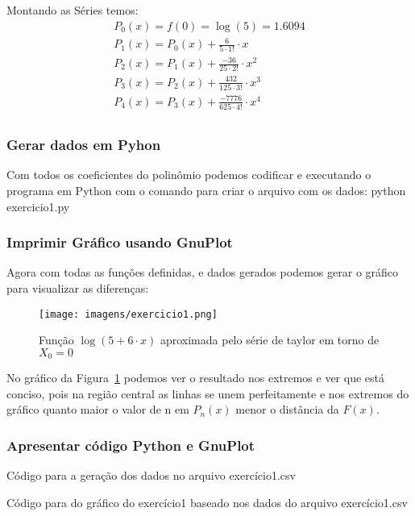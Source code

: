 Montando as Séries temos:
    \begin{gather*}
        P_0 (x) = f(0) = \log(5) = 1.6094\\
        P_1 (x) = P_0(x) + \frac{6}{5 \cdot 1!}    \cdot x  \\
        P_2 (x) = P_1(x) + \frac{-36}{25 \cdot 2!} \cdot x^2 \\
        P_3 (x) = P_2(x) + \frac{432}{125 \cdot 3!} \cdot x^3 \\
        P_4 (x) = P_3(x) + \frac{-7776}{625 \cdot 4!} \cdot x^4 \\
    \end{gather*}

\subsubsection{Gerar dados em Pyhon}

Com todos os coeficientes do polinômio podemos codificar e executando o programa em Python com o comando para criar o arquivo com os dados: python exercicio1.py


\subsubsection{Imprimir Gráfico usando GnuPlot}

Agora com todas as funções definidas, e dados gerados podemos gerar o gráfico para visualizar as diferenças:

\begin{figure}[H]
    \centering
    \texttt{[image: imagens/exercicio1.png]}
    \caption{Função $\log(5+6 \cdot x)$ aproximada pelo série de taylor em torno de $X_0=0$}
    \label{fig:grafico}
\end{figure}

No gráfico da Figura~\ref{fig:grafico} podemos ver o resultado nos extremos e ver que está conciso, pois na região central as linhas se unem perfeitamente e nos extremos do gráfico quanto maior o valor de n em $P_n(x)$ menor o distância da $F(x)$.


\subsubsection{Apresentar código Python e GnuPlot}


Código para a geração dos dados no arquivo exercício1.csv
\newpage


Código para do gráfico do exercício1 baseado nos dados do arquivo exercício1.csv






